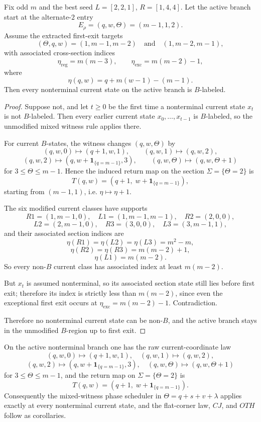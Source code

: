\begin{proposition}
Fix odd $m$ and the best seed $L=[2,2,1]$, $R=[1,4,4]$. Let the active branch start at the alternate-$2$ entry
\[
E_\rho=(q,w,\Theta)=(m-1,1,2).
\]
Assume the extracted first-exit targets
\[
(\Theta,q,w)=(1,m-1,m-2)\quad\text{and}\quad(1,m-2,m-1),
\]
with associated cross-section indices
\[
\eta_{\mathrm{reg}}=m(m-3),\qquad \eta_{\mathrm{exc}}=m(m-2)-1,
\]
where
\[
\eta(q,w)=q+m(w-1)-(m-1).
\]
Then every nonterminal current state on the active branch is $B$-labeled.

\begin{proof}
Suppose not, and let $t\ge 0$ be the first time a nonterminal current state $x_t$ is not $B$-labeled. Then every earlier current state $x_0,\dots,x_{t-1}$ is $B$-labeled, so the unmodified mixed witness rule applies there.

For current $B$-states, the witness changes $(q,w,\Theta)$ by
\[
(q,w,0)\mapsto(q+1,w,1),\qquad (q,w,1)\mapsto(q,w,2),
\]
\[
(q,w,2)\mapsto(q,w+\mathbf 1_{\{q=m-1\}},3),\qquad (q,w,\Theta)\mapsto(q,w,\Theta+1)
\]
for $3\le \Theta\le m-1$. Hence the induced return map on the section $\Sigma=\{\Theta=2\}$ is
\[
T(q,w)=(q+1,\;w+\mathbf 1_{\{q=m-1\}}),
\]
starting from $(m-1,1)$, i.e. $\eta\mapsto\eta+1$.

The six modified current classes have supports
\[
R1=(1,m-1,0),\quad L1=(1,m-1,m-1),\quad R2=(2,0,0),
\]
\[
L2=(2,m-1,0),\quad R3=(3,0,0),\quad L3=(3,m-1,1),
\]
and their associated section indices are
\[
\eta(R1)=\eta(L2)=\eta(L3)=m^2-m,
\]
\[
\eta(R2)=\eta(R3)=m(m-2)+1,
\]
\[
\eta(L1)=m(m-2).
\]
So every non-$B$ current class has associated index at least $m(m-2)$.

But $x_t$ is assumed nonterminal, so its associated section state still lies before first exit; therefore its index is strictly less than $m(m-2)$, since even the exceptional first exit occurs at $\eta_{\mathrm{exc}}=m(m-2)-1$. Contradiction.

Therefore no nonterminal current state can be non-$B$, and the active branch stays in the unmodified $B$-region up to first exit.
\end{proof}
\end{proposition}

\begin{corollary}
On the active nonterminal branch one has the raw current-coordinate law
\[
(q,w,0)\mapsto(q+1,w,1),\quad (q,w,1)\mapsto(q,w,2),
\]
\[
(q,w,2)\mapsto(q,w+\mathbf 1_{\{q=m-1\}},3),\quad (q,w,\Theta)\mapsto(q,w,\Theta+1)
\]
for $3\le \Theta\le m-1$, and the return map on $\Sigma=\{\Theta=2\}$ is
\[
T(q,w)=(q+1,\;w+\mathbf 1_{\{q=m-1\}}).
\]
Consequently the mixed-witness phase scheduler in $\Theta=q+s+v+\lambda$ applies exactly at every nonterminal current state, and the flat-corner law, $CJ$, and $OTH$ follow as corollaries.
\end{corollary}
